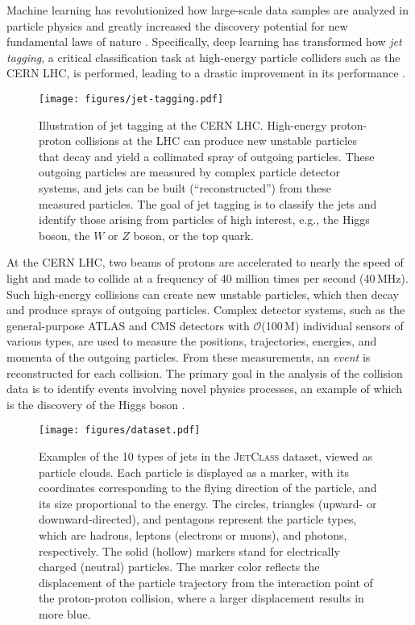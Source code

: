 \documentclass[nohyperref]{article}
\theoremstyle{plain}
\theoremstyle{definition}
\theoremstyle{remark}
\newcommand{\jetclass}{{\textsc{JetClass}}\xspace}
\begin{document}
Machine learning has revolutionized how large-scale data samples are analyzed in particle physics and greatly increased the discovery potential for new fundamental laws of nature \cite{Radovic:2018dip}. Specifically, deep learning has transformed how \textit{jet tagging}, a critical classification task at high-energy particle colliders such as the CERN LHC, is performed, leading to a drastic improvement in its performance \cite{Kogler:2018hem,Larkoski:2017jix}.

\begin{figure}[tb]
\begin{center}
\centerline{\texttt{[image: figures/jet-tagging.pdf]}}
\caption{Illustration of jet tagging at the CERN LHC. High-energy proton-proton collisions at the LHC can produce new unstable particles that decay and yield a collimated spray of outgoing particles. These outgoing particles are measured by complex particle detector systems, and jets can be built (``reconstructed'') from these measured particles. The goal of jet tagging is to classify the jets and identify those arising from particles of high interest, e.g., the Higgs boson, the $W$ or $Z$ boson, or the top quark.}
\label{fig:jet-tagging}
\end{center}
\vskip -0.4in
\end{figure}

At the CERN LHC, two beams of protons are accelerated to nearly the speed of light and made to collide at a frequency of 40 million times per second (40\,MHz). Such high-energy collisions can create new unstable particles, which then decay and produce sprays of outgoing particles. Complex detector systems, such as the general-purpose ATLAS \cite{ATLAS:2008xda} and CMS \cite{CMS:2008xjf} detectors with $\mathcal{O}$(100\,M) individual sensors of various types, are used to measure the positions, trajectories, energies, and momenta of the outgoing particles. From these measurements, an \textit{event} is reconstructed for each collision. The primary goal in the analysis of the collision data is to identify events involving novel physics processes, an example of which is the discovery of the Higgs boson \cite{ATLAS:2012yve,CMS:2012qbp}. 


\begin{figure*}[t]
\begin{center}
\centerline{\texttt{[image: figures/dataset.pdf]}}
\vskip -0.2in
\caption{Examples of the 10 types of jets in the \jetclass dataset, viewed as particle clouds. Each particle is displayed as a marker, with its coordinates corresponding to the flying direction of the particle, and its size proportional to the energy. The circles, triangles (upward- or downward-directed), and pentagons represent the particle types, which are hadrons, leptons (electrons or muons), and photons, respectively. The solid (hollow) markers stand for electrically charged (neutral) particles. The marker color reflects the displacement of the particle trajectory from the interaction point of the proton-proton collision, where a larger displacement results in more blue.}
\label{fig:dataset}
\end{center}
\vskip -0.4in
\end{figure*}
\end{document}
